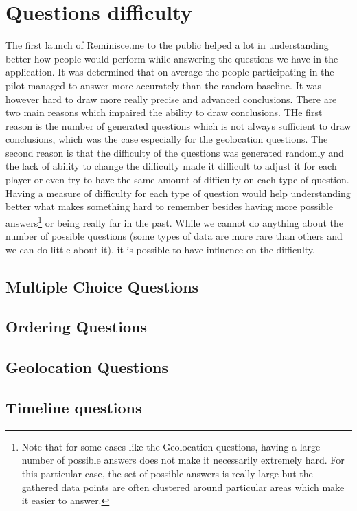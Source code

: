 \chapter{Questions difficulty}
The first launch of Reminisce.me to the public helped a lot in understanding better how people would perform while answering the questions we have in the application. It was determined that on average the people participating in the pilot managed to answer more accurately than the random baseline. It was however hard to draw more really precise and advanced conclusions. There are two main reasons which impaired the ability to draw conclusions. THe first reason is the number of generated questions which is not always sufficient to draw conclusions, which was the case especially for the geolocation questions. The second reason is that the difficulty of the questions was generated randomly and the lack of ability to change the difficulty made it difficult to adjust it for each player or even try to have the same amount of difficulty on each type of question. Having a measure of difficulty for each type of question would help understanding better what makes something hard to remember besides having more possible answers\footnote{Note that for some cases like the Geolocation questions, having a large number of possible answers does not make it necessarily extremely hard. For this particular case, the set of possible answers is really large but the gathered data points are often clustered around particular areas which make it easier to answer.} or being really far in the past. While we cannot do anything about the number of possible questions (some types of data are more rare than others and we can do little about it), it is possible to have influence on the difficulty.

\section{Multiple Choice Questions}
\section{Ordering Questions}
\section{Geolocation Questions}
\section{Timeline questions}